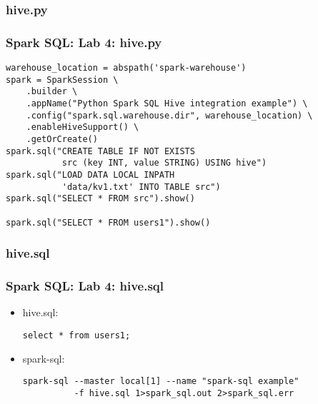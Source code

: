 \documentclass{beamer}
\begin{document}
\subsubsection{hive.py}
\begin{frame}[fragile]
  \frametitle{Spark SQL: Lab 4: hive.py}
{\small
{\color{mycolorcode}
\begin{verbatim}
warehouse_location = abspath('spark-warehouse')
spark = SparkSession \
    .builder \
    .appName("Python Spark SQL Hive integration example") \
    .config("spark.sql.warehouse.dir", warehouse_location) \
    .enableHiveSupport() \
    .getOrCreate()
spark.sql("CREATE TABLE IF NOT EXISTS 
           src (key INT, value STRING) USING hive")
spark.sql("LOAD DATA LOCAL INPATH 
           'data/kv1.txt' INTO TABLE src")
spark.sql("SELECT * FROM src").show()

spark.sql("SELECT * FROM users1").show()
\end{verbatim}
}
}
\end{frame}


\subsubsection{hive.sql}
\begin{frame}[fragile]
\frametitle{Spark SQL: Lab 4: hive.sql}
\begin{itemize}
\item hive.sql:
{\small
{\color{mycolorcode}
\begin{verbatim}
select * from users1;
\end{verbatim}
}
}

\item spark-sql:
{\small
{\color{mycolorcli}
\begin{verbatim}
spark-sql --master local[1] --name "spark-sql example" 
          -f hive.sql 1>spark_sql.out 2>spark_sql.err
\end{verbatim}
}
}
\end{itemize}
\end{frame}
\end{document}
